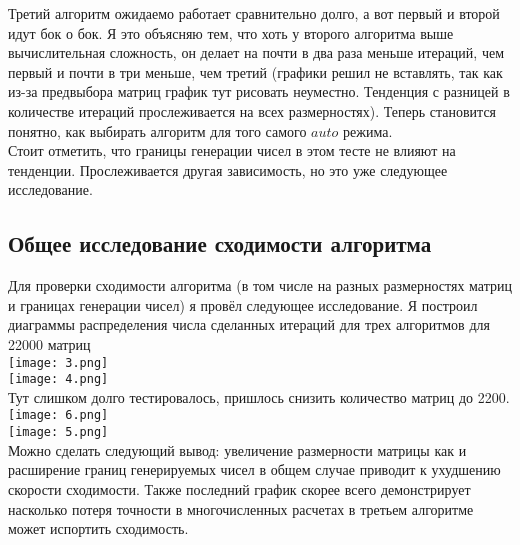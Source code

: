 \documentclass[a4paper,12pt,fleqn]{article}
\begin{document}
Третий алгоритм ожидаемо работает сравнительно долго, а вот первый и второй идут бок о бок. Я это объясняю тем, что хоть у второго алгоритма выше вычислительная сложность, он делает на почти в два раза меньше итераций, чем первый и почти в три меньше, чем третий (графики решил не вставлять, так как из-за предвыбора матриц график тут рисовать неуместно. Тенденция с разницей в количестве итераций прослеживается на всех размерностях). Теперь становится понятно, как выбирать алгоритм для того самого $auto$ режима.\\
Стоит отметить, что границы генерации чисел в этом тесте не влияют на тенденции. Прослеживается другая зависимость, но это уже следующее исследование.\\


\subsection{Общее исследование сходимости алгоритма}
Для проверки сходимости алгоритма (в том числе на разных размерностях матриц и границах генерации чисел) я провёл следующее исследование. Я построил диаграммы распределения числа сделанных итераций для трех алгоритмов для 22000 матриц\\
\texttt{[image: 3.png]}\\
\texttt{[image: 4.png]}\\
Тут слишком долго тестировалось, пришлось снизить количество матриц до 2200.\\
\texttt{[image: 6.png]}\\
\texttt{[image: 5.png]}\\
Можно сделать следующий вывод: увеличение размерности матрицы как и расширение границ генерируемых чисел в общем случае приводит к ухудшению скорости сходимости. Также последний график скорее всего демонстрирует насколько потеря точности в многочисленных расчетах в третьем алгоритме может испортить сходимость.\\
\end{document}
